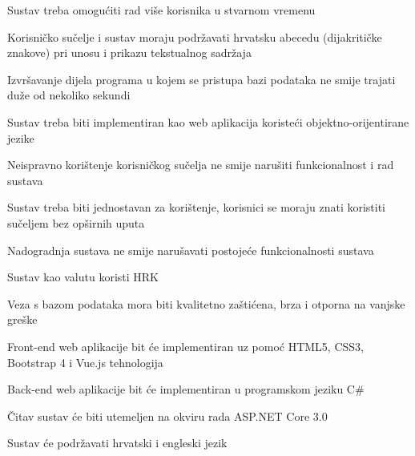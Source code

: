 			\begin{packed_item}
				\item Sustav treba omogućiti rad više korisnika u stvarnom vremenu
				\item Korisničko sučelje i sustav moraju podržavati hrvatsku abecedu (dijakritičke znakove) pri unosu i prikazu tekstualnog sadržaja
				\item Izvršavanje dijela programa u kojem se pristupa bazi podataka ne smije trajati duže od nekoliko sekundi
				\item Sustav treba biti implementiran kao web aplikacija koristeći objektno-orijentirane jezike
				\item Neispravno korištenje korisničkog sučelja ne smije narušiti funkcionalnost i rad sustava
				\item Sustav treba biti jednostavan za korištenje, korisnici se moraju znati koristiti sučeljem bez opširnih uputa
				\item Nadogradnja sustava ne smije narušavati postojeće funkcionalnosti sustava
				\item Sustav kao valutu koristi HRK
				\item Veza s bazom podataka mora biti kvalitetno zaštićena, brza i otporna na vanjske greške
				\item Front-end web aplikacije bit će implementiran uz pomoć HTML5, CSS3, Bootstrap 4 i Vue.js tehnologija
				\item Back-end web aplikacije bit će implementiran u programskom jeziku C\#
				\item Čitav sustav će biti utemeljen na okviru rada ASP.NET Core 3.0
				\item Sustav će podržavati hrvatski i engleski jezik
			\end{packed_item}

			 
			 
			 
	